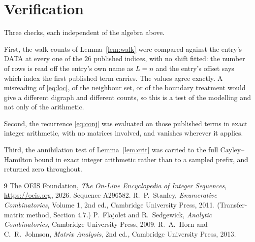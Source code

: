 \documentclass[11pt,a4paper]{article}
\theoremstyle{plain}
\theoremstyle{definition}
\begin{document}
\section{Verification}

Three checks, each independent of the algebra above.

First, the walk counts of Lemma~\ref{lem:walk} were compared against the entry's DATA at
every one of the $26$ published indices, with no shift fitted: the number of rows is
read off the entry's own name as $L=n$ and the entry's offset says which index the first
published term carries. The values agree exactly. A misreading of \eqref{eq:loc}, of the
neighbour set, or of the boundary treatment would give a different digraph and different
counts, so this is a test of the modelling and not only of the arithmetic.

Second, the recurrence \eqref{eq:conj} was evaluated on those published terms in exact
integer arithmetic, with no matrices involved, and vanishes wherever it applies.

Third, the annihilation test of Lemma~\ref{lem:crit} was carried to the full
Cayley--Hamilton bound in exact integer arithmetic rather than to a sampled prefix, and
returned zero throughout.

\begin{thebibliography}{9}
 The OEIS Foundation, \emph{The On-Line Encyclopedia of Integer
Sequences}, \url{https://oeis.org}, 2026. Sequence A296582.
 R.~P.~Stanley, \emph{Enumerative Combinatorics}, Volume 1, 2nd ed.,
Cambridge University Press, 2011. (Transfer-matrix method, Section 4.7.)
 P.~Flajolet and R.~Sedgewick, \emph{Analytic Combinatorics}, Cambridge
University Press, 2009.
 R.~A.~Horn and C.~R.~Johnson, \emph{Matrix Analysis}, 2nd ed., Cambridge
University Press, 2013.
\end{thebibliography}
\end{document}
